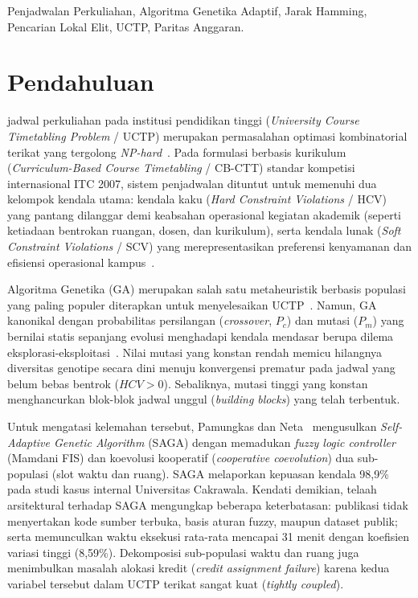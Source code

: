 \documentclass[journal]{IEEEtran}
\begin{document}
\begin{IEEEkeywords}
Penjadwalan Perkuliahan, Algoritma Genetika Adaptif, Jarak Hamming, Pencarian Lokal Elit, UCTP, Paritas Anggaran.
\end{IEEEkeywords}

\section{Pendahuluan}
 jadwal perkuliahan pada institusi pendidikan tinggi (\textit{University Course Timetabling Problem} / UCTP) merupakan permasalahan optimasi kombinatorial terikat yang tergolong \textit{NP-hard}~\cite{bettinelli2015survey}. Pada formulasi berbasis kurikulum (\textit{Curriculum-Based Course Timetabling} / CB-CTT) standar kompetisi internasional ITC 2007, sistem penjadwalan dituntut untuk memenuhi dua kelompok kendala utama: kendala kaku (\textit{Hard Constraint Violations} / HCV) yang pantang dilanggar demi keabsahan operasional kegiatan akademik (seperti ketiadaan bentrokan ruangan, dosen, dan kurikulum), serta kendala lunak (\textit{Soft Constraint Violations} / SCV) yang merepresentasikan preferensi kenyamanan dan efisiensi operasional kampus~\cite{bonutti2012benchmarking}.

Algoritma Genetika (GA) merupakan salah satu metaheuristik berbasis populasi yang paling populer diterapkan untuk menyelesaikan UCTP~\cite{goldberg1989genetic}. Namun, GA kanonikal dengan probabilitas persilangan (\textit{crossover}, $P_c$) dan mutasi ($P_m$) yang bernilai statis sepanjang evolusi menghadapi kendala mendasar berupa dilema eksplorasi-eksploitasi~\cite{eiben1999parameter,karafotias2015parameter}. Nilai mutasi yang konstan rendah memicu hilangnya diversitas genotipe secara dini menuju konvergensi prematur pada jadwal yang belum bebas bentrok ($HCV > 0$). Sebaliknya, mutasi tinggi yang konstan menghancurkan blok-blok jadwal unggul (\textit{building blocks}) yang telah terbentuk.

Untuk mengatasi kelemahan tersebut, Pamungkas dan Neta~\cite{pamungkas2025saga} mengusulkan \textit{Self-Adaptive Genetic Algorithm} (SAGA) dengan memadukan \textit{fuzzy logic controller} (Mamdani FIS) dan koevolusi kooperatif (\textit{cooperative coevolution}) dua sub-populasi (slot waktu dan ruang). SAGA melaporkan kepuasan kendala 98,9\% pada studi kasus internal Universitas Cakrawala. Kendati demikian, telaah arsitektural terhadap SAGA mengungkap beberapa keterbatasan: publikasi tidak menyertakan kode sumber terbuka, basis aturan fuzzy, maupun dataset publik; serta memunculkan waktu eksekusi rata-rata mencapai 31 menit dengan koefisien variasi tinggi (8,59\%). Dekomposisi sub-populasi waktu dan ruang juga menimbulkan masalah alokasi kredit (\textit{credit assignment failure}) karena kedua variabel tersebut dalam UCTP terikat sangat kuat (\textit{tightly coupled}).
\end{document}
